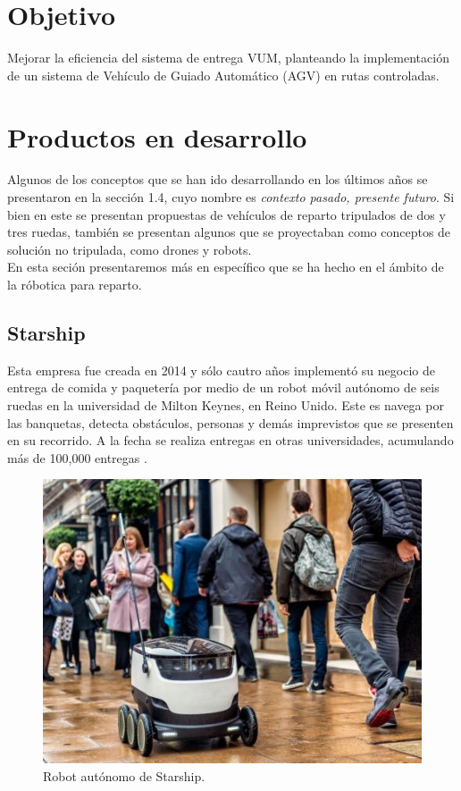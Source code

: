 \section{Objetivo}

Mejorar la eficiencia del sistema de entrega VUM, planteando la implementación de un sistema de Vehículo de Guiado Automático (AGV) en rutas controladas.

\section{Productos en desarrollo}

Algunos de los conceptos que se han ido desarrollando en los últimos años se presentaron en la sección 1.4, cuyo nombre es \textit{contexto pasado, presente futuro}. Si bien en este se presentan propuestas de vehículos de reparto tripulados de dos y tres ruedas, también se presentan algunos que se proyectaban como conceptos de solución no tripulada, como drones y robots. \\
En esta seción presentaremos más en específico que se ha hecho en el ámbito de la róbotica para reparto.

\subsection{Starship} 
Esta empresa fue creada en 2014 y sólo cautro años implementó su negocio de entrega de comida y paquetería por medio de un robot móvil autónomo de seis ruedas en la universidad de Milton Keynes, en Reino Unido. Este es navega por las banquetas, detecta obstáculos, personas y demás imprevistos que se presenten en su recorrido. A la fecha se realiza entregas en otras universidades, acumulando más de 100,000 entregas \cite{starship}.

	\begin{figure}[hbtp]
	\centering
	\includegraphics[scale=0.6]{Figures/Starship_Picture.jpg}
	\caption{Robot autónomo de Starship\cite{starship_picture}.} 
	\end{figure}

